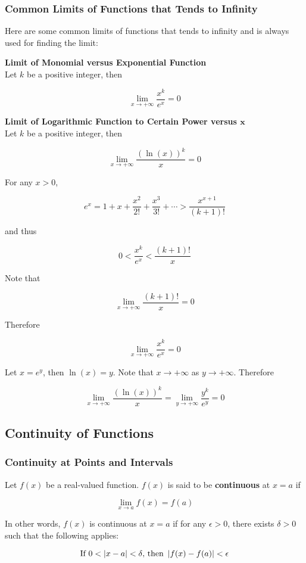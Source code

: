 \documentclass[a4paper,12pt]{article}
\begin{document}
\subsubsection{Common Limits of Functions that Tends to Infinity}
\begin{pst}
  Here are some common limits of functions that tends to infinity and is always used for finding the limit:

  \begin{alist}
    \item \textbf{Limit of Monomial versus Exponential Function}\\
    Let $k$ be a positive integer, then

    $$\lim_{x\to+\infty}\frac{x^{k}}{e^{x}}=0$$

    \item \textbf{Limit of Logarithmic Function to Certain Power versus $\boldsymbol{x}$}\\
    Let $k$ be a positive integer, then

    $$\lim_{x\to+\infty}\frac{(\ln(x))^{k}}{x}=0$$
  \end{alist}

  \prf{} For any $x>0$,

  $$e^{x}=1+x+\frac{x^{2}}{2!}+\frac{x^{3}}{3!}+\cdots>\frac{x^{x+1}}{(k+1)!}$$\s

  and thus

  $$0<\frac{x^{k}}{e^{x}}<\frac{(k+1)!}{x}$$\s

  Note that

  $$\lim_{x\to+\infty}\frac{(k+1)!}{x}=0$$\s

  Therefore

  $$\lim_{x\to+\infty}\frac{x^{k}}{e^{x}}=0$$\s

   Let $x=e^{y}$, then $\ln(x)=y$. Note that $x\to+\infty$ as $y\to+\infty$. Therefore

  $$\lim_{x\to+\infty}\frac{(\ln(x))^{k}}{x}=\lim_{y\to+\infty}\frac{y^{k}}{e^{y}}=0$$
\end{pst}

\subsection{Continuity of Functions}
\subsubsection{Continuity at Points and Intervals}
\begin{dft}
  Let $f(x)$ be a real-valued function. $f(x)$ is said to be \textbf{continuous} at $x=a$ if

  $$\lim_{x\to a}f(x)=f(a)$$\s

  In other words, $f(x)$ is continuous at $x=a$ if for any $\epsilon>0$, there exists $\delta>0$ such that the following applies:

  $$\text{If }0<\left| x-a\right|<\delta\text{, then }\left| f(x)-f(a)\right|<\epsilon$$
\end{dft}\n
\end{document}
